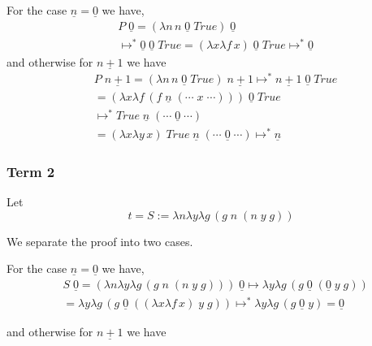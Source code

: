\documentclass{article}
\begin{document}
For the case $\underline{n}=\underline{0}$ we have, 
\begin{equation*}
\begin{split}
&P\; \underline{0} = (\lambda n \, n \;\underline{0}\; True) \; \underline{0} \\
&\mapsto^* \underline{0} \; \underline{0} \; True = (\lambda x \lambda f \, x) \; \underline{0} \; True \mapsto^* \underline{0}
\end{split}
\end{equation*}
and otherwise for $\underline{n+1}$ we have 
\begin{equation*}
\begin{split}
&P\; \underline{n+1} = (\lambda n \, n \;\underline{0}\; True) \; \underline{n+1} 
\mapsto^* \underline{n+1} \; \underline{0} \; True\\
&= (\lambda x \lambda f \, (f\; \underline{n}\; (\cdots \;  x \; \cdots))) \; \underline{0} \; True  \\
&\mapsto^* True\; \underline{n}\; (\cdots \; \underline{0}\; \cdots) \\
&=  (\lambda x \lambda y \, x)\; True\; \underline{n}\; (\cdots \; \underline{0}\; \cdots) \mapsto^* \underline{n}
\end{split}
\end{equation*}


\subsubsection*{Term 2}
Let 
\begin{equation*}
t = S := \lambda n \lambda y \lambda g \,(g \; n \; ( n \; y \; g))
\end{equation*}

We separate the proof into two cases.

For the case $\underline{n} =\underline{0}$ we have, 
\begin{equation*}
\begin{split}
&S\; \underline{0} =  (\lambda n \lambda y \lambda g \,(g \; n \; ( n \; y \; g))) \; \underline{0} \mapsto  \lambda y \lambda g \,(g \;  \underline{0} \; (  \underline{0} \; y \; g)) \\
&= \lambda y \lambda g \,(g \;  \underline{0} \; (  (\lambda x \lambda f \, x)  \; y \; g)) 
\mapsto^*  \lambda y \lambda g \,(g \;  \underline{0} \; y) = \underline{0}
\end{split}
\end{equation*}

and otherwise for $\underline{n+1}$ we have 
\end{document}
